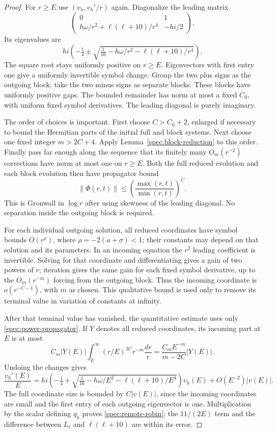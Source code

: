 \documentclass[11pt]{article}
\numberwithin{equation}{section}
\theoremstyle{definition}
\theoremstyle{remark}
\begin{document}
\begin{proof}
For $r\ge E$ use $(v_h,v_h'/r)$ again. Diagonalize the leading matrix
\[
 \begin{pmatrix}
 0&1\\ h\omega/r^2+\ell(\ell+10)/r^4&-hi/2
 \end{pmatrix}.
\]
Its eigenvalues are
\[
 hi\left(-\tfrac14\pm
 \sqrt{\tfrac1{16}-h\omega/r^2-\ell(\ell+10)/r^4}\right).
\]
The square root stays uniformly positive on $r\ge E$. Eigenvectors
with first entry one give a uniformly invertible symbol change.
Group the two plus signs as the outgoing block; take the two minus
signs as separate blocks. These blocks have uniformly positive gaps.
The bounded remainder has norm at most a fixed $C_0$, with uniform
fixed symbol derivatives. The leading diagonal is purely imaginary.

The order of choices is important. First choose $C>C_0+2$, enlarged
if necessary to bound the Hermitian parts of the initial full and
block systems. Next choose one fixed integer $m>2C+4$. Apply
Lemma~\ref{spec:block-reduction} to this order. Finally pass far enough
along the sequence that its finitely many $O_m(r^{-2})$ corrections
have norm at most one on $r\ge E$. Both the full reduced evolution
and each block evolution then have propagator bound
\begin{equation}\label{spec:power-propagator}
 \|\Phi(r,t)\|\le
 \left(\frac{\max(r,t)}{\min(r,t)}\right)^C.
\end{equation}
This is Gronwall in $\log r$ after using skewness of the leading
diagonal. No separation inside the outgoing block is required.

For each individual outgoing solution, all reduced coordinates have
symbol bounds $O(r^\rho)$, where $\rho=-2(a+\sigma)<1$; their constants
may depend on that solution and its parameters. In an incoming
equation the $r^2$ leading coefficient is invertible. Solving for that
coordinate and differentiating gives a gain of two powers of $r$;
iteration gives the same gain for each fixed symbol derivative, up
to the $O_m(r^{-m})$ forcing from the outgoing block. Thus the incoming
coordinate is $o(r^{-C-1})$, with $m$ as chosen. This qualitative
bound is used only to remove its terminal value in variation of
constants at infinity.

After that terminal value has vanished, the quantitative estimate
uses only \eqref{spec:power-propagator}. If $Y$ denotes all reduced
coordinates, its incoming part at $E$ is at most
\[
 C_m|Y(E)|\int_E^\infty(r/E)^{2C}r^{-m}\frac{dr}{r}
 =\frac{C_mE^{-m}}{m-2C}|Y(E)|.
\]
Undoing the changes gives
\[
 \frac{v_h'(E)}E=
 hi\left(-\tfrac14+
 \sqrt{\tfrac1{16}-h\omega/E^2-\ell(\ell+10)/E^4}\right)v_h(E)
 +O(E^{-2})|v(E)|.
\]
The full coordinate size is bounded by $C|v(E)|$, since the incoming
coordinates are small and the first entry of each outgoing
eigenvector is one. Multiplication by the scalar defining $q_h$
proves \eqref{spec:remote-robin}; the $11/(2E)$ term and the difference
between $L_\ell$ and $\ell(\ell+10)$ are within its error.
\end{proof}
\end{document}
